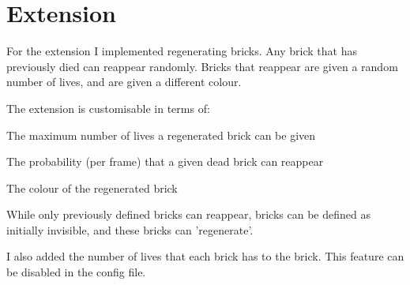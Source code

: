 \section*{Extension }

For the extension I implemented regenerating bricks. Any brick that has previously died can reappear randomly. Bricks that reappear are given a random number of lives, and are given a different colour.

The extension is customisable in terms of\+:


\begin{DoxyItemize}
\item The maximum number of lives a regenerated brick can be given
\item The probability (per frame) that a given dead brick can reappear
\item The colour of the regenerated brick
\end{DoxyItemize}

While only previously defined bricks can reappear, bricks can be defined as initially invisible, and these bricks can 'regenerate'.

I also added the number of lives that each brick has to the brick. This feature can be disabled in the config file. 